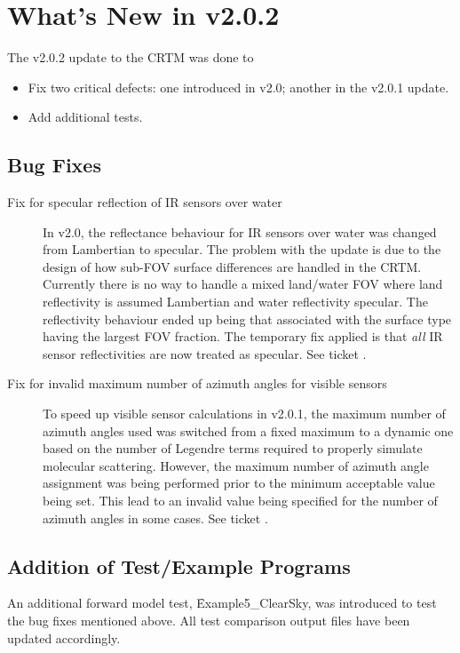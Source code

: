 \chapter*{What's New in v2.0.2}

The v2.0.2 update to the CRTM was done to
\begin{itemize}
  \item Fix two critical defects: one introduced in v2.0; another in the v2.0.1 update.
  \item Add additional tests.
\end{itemize}

\section*{Bug Fixes}

\begin{description}

\item[Fix for specular reflection of IR sensors over water] In v2.0, the reflectance behaviour for IR sensors over water was changed from Lambertian to specular. The problem with the update is due to the design of how sub-FOV surface differences are handled in the CRTM. Currently there is no way to handle a mixed land/water FOV where land reflectivity is assumed Lambertian and water reflectivity specular. The reflectivity behaviour ended up being that associated with the surface type having the largest FOV fraction. The temporary fix applied is that \emph{all} IR sensor reflectivities are now treated as specular. See ticket .

\item[Fix for invalid maximum number of azimuth angles for visible sensors] To speed up visible sensor calculations in v2.0.1, the maximum number of azimuth angles used was switched from a fixed maximum to a dynamic one based on the number of Legendre terms required to properly simulate molecular scattering. However, the maximum number of azimuth angle assignment was being performed prior to the minimum acceptable value being set. This lead to an invalid value being specified for the number of azimuth angles in some cases. See ticket .

\end{description}



\section*{Addition of Test/Example Programs}

An additional forward model test, \f{Example5\_ClearSky}, was introduced to test the bug fixes mentioned above. All test comparison output files have been updated accordingly.

